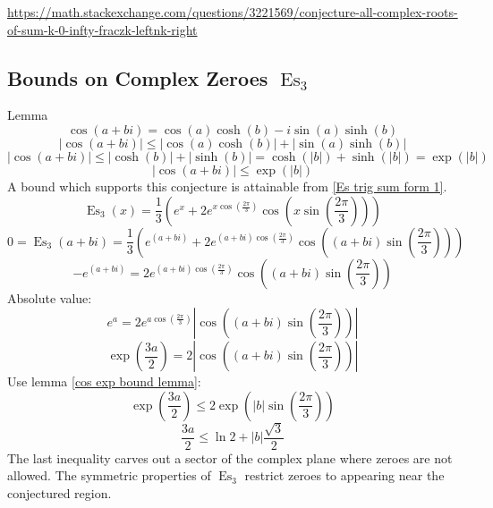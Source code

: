 \documentclass[]{article}
\DeclareMathOperator{\es}{Es}
\newcommand{\pqty}[1]{{\left(#1\right)}}
\newcommand{\abs}[1]{{\left\lvert#1\right\rvert}}
\numberwithin{equation}{section}
\begin{document}
	\url{https://math.stackexchange.com/questions/3221569/conjecture-all-complex-roots-of-sum-k-0-infty-fraczk-leftnk-right}
	
	\subsection{Bounds on Complex Zeroes \(\es_3\)}
	Lemma
	\begin{equation}
	\cos\pqty{a+bi}=\cos\pqty{a}\cosh\pqty{b}-i\sin\pqty{a}\sinh\pqty{b}
	\end{equation}
	\begin{equation}
	\abs{\cos\pqty{a+bi}} \leq \abs{\cos\pqty{a}\cosh\pqty{b}}+\abs{\sin\pqty{a}\sinh\pqty{b}}
	\end{equation}
	\begin{equation}
	\abs{\cos\pqty{a+bi}} \leq \abs{\cosh\pqty{b}}+\abs{\sinh\pqty{b}}
	= \cosh\pqty{\abs{b}}+{\sinh\pqty{\abs{b}}} = \exp\pqty{\abs{b}}
	\end{equation}
	\begin{equation}
	\label{cos exp bound lemma}
	\abs{\cos\pqty{a+bi}} \leq \exp\pqty{\abs{b}}
	\end{equation}
	A bound which supports this conjecture is attainable from \eqref{Es trig sum form 1}.
	\begin{equation}
	\es_3\pqty{x}=
	\frac{1}{3}\pqty{
		e^x
		+2e^{x\cos\pqty{\frac{2\pi}{3}}} \cos\pqty{x\sin\pqty{\frac{2\pi}{3}}}
	}
	\end{equation}
	\begin{equation}
	0=\es_3\pqty{a+bi}=
	\frac{1}{3}\pqty{
		e^\pqty{a+bi}
		+2e^{\pqty{a+bi}\cos\pqty{\frac{2\pi}{3}}} \cos\pqty{\pqty{a+bi}\sin\pqty{\frac{2\pi}{3}}}
	}
	\end{equation}
	\begin{equation}
	-e^\pqty{a+bi}=
	2e^{\pqty{a+bi}\cos\pqty{\frac{2\pi}{3}}} \cos\pqty{\pqty{a+bi}\sin\pqty{\frac{2\pi}{3}}}
	\end{equation}
	Absolute value:
	\begin{equation}
	e^{a}=
	2e^{{a}\cos\pqty{\frac{2\pi}{3}}} \abs{\cos\pqty{\pqty{a+bi}\sin\pqty{\frac{2\pi}{3}}}}
	\end{equation}
	\begin{equation}
	\exp\pqty{\frac{3a}{2}}=
	2 \abs{\cos\pqty{\pqty{a+bi}\sin\pqty{\frac{2\pi}{3}}}}
	\end{equation}
	Use lemma \eqref{cos exp bound lemma}:
	\begin{equation}
	\exp\pqty{\frac{3a}{2}} \leq
	2 {\exp\pqty{\abs{b}\sin\pqty{\frac{2\pi}{3}}}}
	\end{equation}
	\begin{equation}
	{\frac{3a}{2}} \leq
	\ln{2}+ {\abs{b}\frac{\sqrt{3}}{2}}
	\end{equation}
	The last inequality carves out a sector of the complex plane where zeroes are not allowed. The symmetric properties of \(\es_3\) restrict zeroes to appearing near the conjectured region.
	
\end{document}
